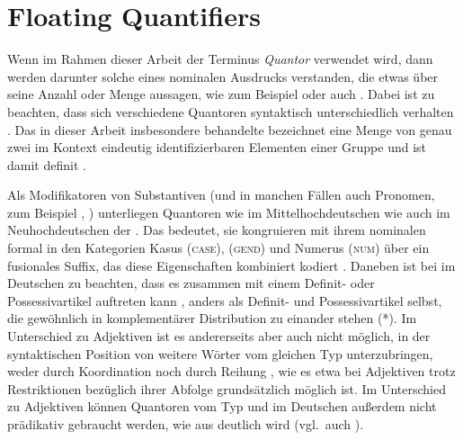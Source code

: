 
\section{Floating Quantifiers}
\label{sec:floatquant}

Wenn im Rahmen dieser Arbeit der Terminus \textit{Quantor} verwendet wird, dann
werden darunter solche  eines nominalen Ausdrucks
verstanden, die etwas über seine Anzahl oder Menge aussagen, wie zum Beispiel
 oder auch . Dabei ist zu beachten, dass
sich verschiedene Quantoren syntaktisch unterschiedlich verhalten
\autocites[27--28]{pittner1995}[11--12]{haspelmath1997}. Das in dieser Arbeit
insbesondere behandelte  bezeichnet eine Menge von genau
zwei im Kontext eindeutig identifizierbaren Elementen einer Gruppe
\autocite[vgl.][307]{keenan2006} und ist damit definit
\autocite[265--268]{lyons1999}.

Als Modifikatoren von Substantiven (und in manchen Fällen auch Pronomen, zum
Beispiel , ) unterliegen Quantoren wie
 im Mittelhochdeutschen wie auch 
im Neuhochdeutschen der . Das
bedeutet, sie kongruieren mit ihrem nominalen  formal in den
Kategorien Kasus (\textsc{case}),  (\textsc{gend}) und Numerus
(\textsc{num}) über ein fusionales Suffix, das diese Eigenschaften kombiniert
kodiert \autocites(vgl.~auch ,
)[181--184]{ksw2}[772]{woellstein2022}. Daneben ist bei
 im Deutschen zu beachten, dass es zusammen mit
einem Definit- oder Possessivartikel auftreten kann
, anders als Definit- und Possessivartikel selbst, die
gewöhnlich in komplementärer Distribution zu
einander stehen (*). Im Unterschied zu
Adjektiven ist es andererseits aber auch nicht möglich,
in der syntaktischen Position von  weitere Wörter vom gleichen Typ
unterzubringen, weder durch Koordination  noch durch Reihung
, wie es etwa bei Adjektiven trotz
Restriktionen bezüglich ihrer Abfolge grundsätzlich möglich ist. Im Unterschied
zu Adjektiven können Quantoren vom Typ  und
 im Deutschen außerdem nicht prädikativ gebraucht
werden, wie aus  deutlich wird (vgl.~auch \cite[181,
Fußnote~1]{merchant1996}).

